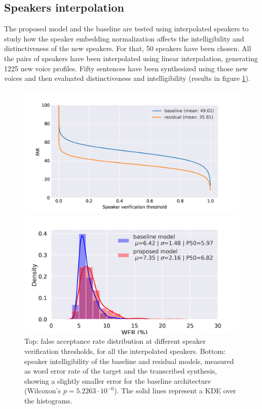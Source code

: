 \subsection{Speakers interpolation}
The proposed model and the baseline are tested using interpolated speakers to study how the speaker embedding normalization affects the intelligibility and distinctiveness of the new speakers. For that, 50 speakers have been chosen. All the pairs of speakers have been interpolated using linear interpolation, generating 1225 new voice profiles. Fifty sentences have been synthesized using those new voices and then evaluated distinctiveness and intelligibility (results in figure \ref{fig:svps}).

\begin{figure}[h!]
	\centering
	\includegraphics[width=0.7\linewidth]{tts/images/far_svps}

	\includegraphics[width=0.7\linewidth]{tts/images/wer_svps}
	\caption[Speaker interpolation results for the TTS models]{Top: false acceptance rate distribution at different speaker verification thresholds, for all the interpolated speakers. Bottom: speaker intelligibility of the baseline and residual models, measured as word error rate of the target and the transcribed synthesis, showing a slightly smaller error for the baseline architecture (Wilcoxon's $p=5.2263\cdot 10^{-6}$). The solid lines represent a KDE over the histograms.}
	\label{fig:svps}
\end{figure}

